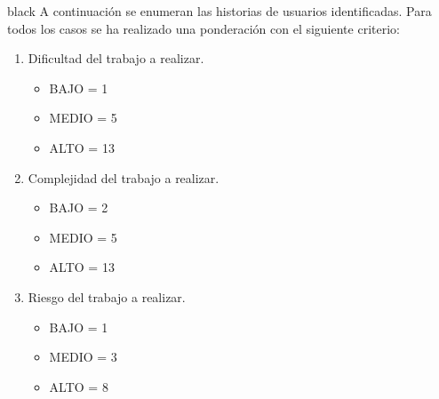 \documentclass[
11pt, %
codirector, %
]{charter}
\begin{document}
\begin{consigna}{black}
A continuación se enumeran las historias de usuarios identificadas. Para todos los casos se ha realizado una ponderación con el siguiente criterio:
\begin{enumerate}
	\item Dificultad del trabajo a realizar.
	\begin{itemize}
		\item BAJO = 1
		\item MEDIO = 5
		\item ALTO = 13
	\end{itemize}	
	\item Complejidad del trabajo a realizar.
	\begin{itemize}
		\item BAJO = 2
		\item MEDIO = 5
		\item ALTO = 13
	\end{itemize}	
	\item Riesgo del trabajo a realizar.
	\begin{itemize}
		\item BAJO = 1
		\item MEDIO = 3
		\item ALTO = 8
	\end{itemize}	
\end{enumerate}


\end{consigna}
\end{document}
